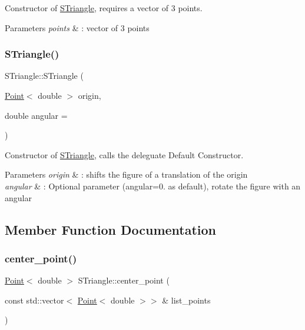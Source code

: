 Constructor of \hyperlink{classSTriangle}{S\+Triangle}, requires a vector of 3 points. 


\begin{DoxyParams}{Parameters}
{\em points} & \+: vector of 3 points \\
\hline
\end{DoxyParams}
\mbox{\label{classSTriangle_acea39386c34a9f216691a93b5238152d}} 
\subsubsection{\texorpdfstring{S\+Triangle()}{STriangle()}\hspace{0.1cm}{\footnotesize\ttfamily [3/3]}}
{\footnotesize\ttfamily S\+Triangle\+::\+S\+Triangle (\begin{DoxyParamCaption}\item[{\hyperlink{classPoint}{Point}$<$ double $>$}]{origin,  }\item[{double}]{angular = {} }\end{DoxyParamCaption})\hspace{0.3cm}{\ttfamily [explicit]}}



Constructor of \hyperlink{classSTriangle}{S\+Triangle}, calls the deleguate Default Constructor. 


\begin{DoxyParams}{Parameters}
{\em origin} & \+: shifts the figure of a translation of the origin \\
\hline
{\em angular} & \+: Optional parameter (angular=0. as default), rotate the figure with an angular \\
\hline
\end{DoxyParams}


\subsection{Member Function Documentation}
\mbox{\label{classSTriangle_ac8e4d59ebc85924650597a181045e2a0}} 
\subsubsection{\texorpdfstring{center\+\_\+point()}{center\_point()}}
{\footnotesize\ttfamily \hyperlink{classPoint}{Point}$<$ double $>$ S\+Triangle\+::center\+\_\+point (\begin{DoxyParamCaption}\item[{const std\+::vector$<$ \hyperlink{classPoint}{Point}$<$ double $>$$>$ \&}]{list\+\_\+points }\end{DoxyParamCaption})\hspace{0.3cm}{\ttfamily [static]}}



